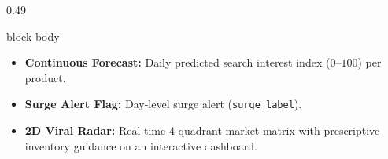 \documentclass[aspectratio=169, 10pt]{beamer}
\newenvironment{card}[1][]{%
        \begin{beamercolorbox}[rounded=true,shadow=false,wd=\linewidth,sep=3.5pt,#1]{block body}%
        \fontsize{7.8pt}{9.8pt}\selectfont%
    }{%
        \end{beamercolorbox}%
    }
\begin{document}
\begin{frame}[t]
\begin{columns}[T]
\begin{column}{0.49\textwidth}
\begin{card}
                    \begin{itemize}\setlength{\itemsep}{1.2pt}                                                                                                                                         
                        \item \textbf{Continuous Forecast:} Daily predicted search interest index ($0$--$100$) per product.                                                                            
                        \item \textbf{Surge Alert Flag:} Day-level surge alert (\texttt{surge\_label}).                                                            
                        \item \textbf{2D Viral Radar:} Real-time 4-quadrant market matrix with prescriptive inventory guidance on an interactive dashboard.                                            
                    \end{itemize}                                                                                                                                                                      
                \end{card}                                                                                                                                                                             
            \end{column}                                                                                                                                                                               
        \end{columns}                                                                                                                                                                                  
    \end{frame}                                                                                                                                                                                        
                                                                                                                                                                                                       
\end{document}
